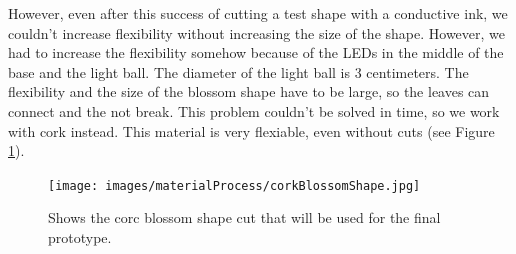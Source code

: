 \documentclass[04.3_buildingProcess.tex]{subfiles}
\begin{document}
\begin{flushleft}
        \noindent
        However, even after this success of cutting a test shape with a conductive ink, we couldn't 
        increase flexibility without increasing the size of the shape. However, we had to increase 
        the flexibility somehow because of the LEDs in the middle of the base and the light ball. 
        The diameter of the light ball is 3 centimeters. The flexibility and the size of the blossom 
        shape have to be large, so the leaves can connect and the not break. This problem couldn't 
        be solved in time, so we work with cork instead. This material is very flexiable, even 
        without cuts (see Figure \ref{fig:corkTest}).\\

        \begin{figure}[H]
            \centering
                \texttt{[image: images/materialProcess/corkBlossomShape.jpg]}
                \caption{Shows the corc blossom shape cut that will be used for the final prototype.}
                \label{fig:corkTest}
        \end{figure}
    \end{flushleft}
\end{document}
